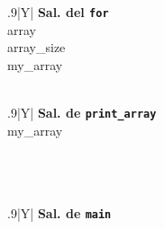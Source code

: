 \documentclass[a4paper]{article}
\begin{document}
\begin{table}[H]
    \begin{subfigure}{0.33333\linewidth}
        \centering
        \begin{tabularx}{.9\linewidth}{|Y|}
        \hline
        \textbf{Sal. del \texttt{for}}\\\hline
        array\\\hline
        array\_size\\\hline
        my\_array\\\hline
        \\ \hline
        \end{tabularx}
    \end{subfigure}%
    \begin{subfigure}{0.33333\linewidth}
        \centering
        \begin{tabularx}{.9\linewidth}{|Y|}
        \hline
        \textbf{Sal. de \texttt{print\_array}} \\\hline
        my\_array\\\hline
        \\ \hline
        \\ \hline
        \\ \hline
        \end{tabularx}
    \end{subfigure}%
    \begin{subfigure}{0.33333\linewidth}
        \centering
        \begin{tabularx}{.9\linewidth}{|Y|}
        \hline
        \textbf{Sal. de \texttt{main}} \\\hline
        \\\hline
        \\ \hline
        \\ \hline
        \\ \hline
        \end{tabularx}
    \end{subfigure}%
\caption{Ejemplo del estado de la pila en una ejecución}
\label{tab:stackExample}
\end{table}
\end{document}
